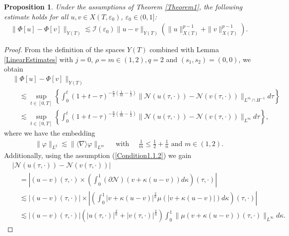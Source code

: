 \documentclass[11pt,reqno]{amsart}
\newtheorem{proposition}{Proposition}[section]
\begin{document}
\begin{proposition}\label{Pro1.2}
    Under the assumptions of Theorem \ref{Theorem1}, the following estimate holds for all $u, v \in X(T, \varepsilon_0)$, $\varepsilon_0 \in (0, 1]$:
    \begin{align*}
        \|\Phi[u]-\Phi[v]\|_{Y(T)} \lesssim \mathcal{I}(\varepsilon_0) \|u-v\|_{Y(T)}\left(\|u\|_{X(T)}^{p-1} + \|v\|_{X(T)}^{p-1}\right).
    \end{align*}
\end{proposition}
    \begin{proof}
        From the definition of the spaces $Y(T)$ combined with Lemma \ref{LinearEstimates} with $j =0, \,\rho = m \in (1,2), q =2 $ and $(s_1,s_2)=(0,0)$, we obtain
        \begin{align*}
            &\|\Phi[u]-\Phi[v]\|_{Y(T)}\\
        &\quad\lesssim \sup_{t \in [0,T]} \left\{\int_0^t (1+t-\tau)^{-\frac{n}{2}(\frac{1}{m}-\frac{1}{2})}\|\mathcal{N}(u(\tau,\cdot))-\mathcal{N}(v(\tau,\cdot))\|_{L^m \cap H^{-1}} d\tau\right\}\\
            &\quad\lesssim \sup_{t \in [0,T]} \left\{\int_0^t (1+t-\tau)^{-\frac{n}{2}(\frac{1}{m}-\frac{1}{2})}\|\mathcal{N}(u(\tau,\cdot))-\mathcal{N}(v(\tau,\cdot))\|_{L^m} d\tau\right\},
        \end{align*}
        where we have the embedding
        \begin{align*}
            \|\varphi\|_{L^2} \lesssim \|\langle \nabla \rangle \varphi\|_{L^m} \quad\text{ with } \quad \frac{1}{m} \leq \frac{1}{2} +\frac{1}{n} \text{ and } m \in (1,2).
        \end{align*}
    Additionally,  using the assumption (\ref{Condition1.1.2}) we gain
    \begin{align*}
        &\left|\mathcal{N}(u(\tau,\cdot))-\mathcal{N}(v(\tau,\cdot))\right| \\
        &\quad=\left| (u-v)(\tau,\cdot) \times \left(\int_0^1  (\partial\mathcal{N})(v +\kappa(u-v)) d\kappa\right)(\tau,\cdot)  \right| \\
        &\quad\lesssim |(u-v)(\tau,\cdot)| \times \left|\left(\int_0^1 |v+ \kappa(u-v)|^{\frac{2}{n}} \mu\left(|v+\kappa(u-v)|\right) d\kappa\right)(\tau,\cdot)\right|\\
        &\quad\lesssim |(u-v)(\tau,\cdot) | \left(|u(\tau,\cdot)|^{\frac{2}{n}} + |v(\tau,\cdot)|^{\frac{2}{n}} \right) \int_0^1\|\mu(v+\kappa(u-v))(\tau,\cdot)\|_{L^\infty} d\kappa.
    \end{align*}

\end{proof}
\end{document}
